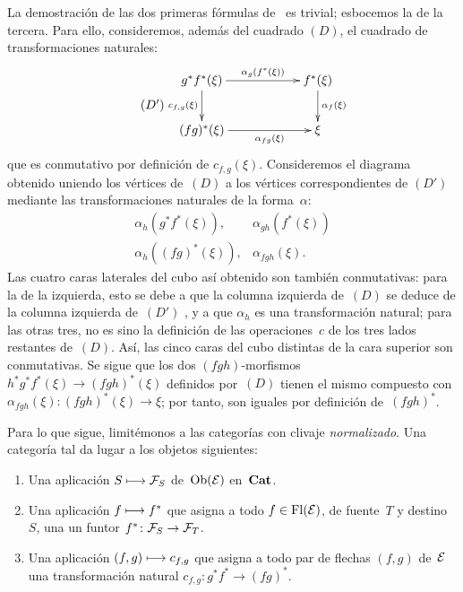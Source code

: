 {\ignorespaces}
{\enlargethispage{.5cm}}
La demostración de las dos primeras fórmulas de~ es trivial;
esbocemos la de la tercera. Para ello, consideremos, además del cuadrado
$(D)$, el cuadrado de transformaciones naturales:
\begin{equation*}
\label{eq:VI.7.D'} \tag{$D'$}
\begin{split}
\xymatrix@C=2cm{
g^*f^*(\xi) \ar[r]^-{\alpha_g(f^*(\xi))}
\ar[d]_{c_{f,g}(\xi)} & f^*(\xi) \ar[d]^{\alpha_f(\xi)} \\
(fg)^*(\xi) \ar[r]_-{\alpha_{fg}(\xi)} & \xi }
\end{split}
\end{equation*}
que
es conmutativo por definición de $c_{f,g}(\xi)$. Consideremos el diagrama
obtenido uniendo los vértices de~$(D)$ a los vértices correspondientes de
$(D')$ mediante las transformaciones naturales de la forma~$\alpha$:
$$
\begin{array}{ll}
\alpha_h(g^*f^*(\xi)),&\alpha_{gh}(f^*(\xi))\\
\alpha_h((fg)^*(\xi)),&\alpha_{fgh}(\xi).
\end{array}
$$
Las cuatro caras laterales del cubo así obtenido son también conmutativas:
para la de la izquierda, esto se debe a que la columna izquierda de~$(D)$
se deduce de la columna izquierda de~$(D')$
%
, y a que $\alpha_h$ es una transformación natural; para las otras tres,
no es sino la definición de las operaciones~$c$ de los tres lados restantes
de~$(D)$. Así, las cinco caras del cubo distintas de la cara superior son
conmutativas. Se sigue que los dos $(fgh)$-morfismos
$h^*g^*f^*(\xi)\to(fgh)^*(\xi)$ definidos por~$(D)$ tienen el mismo
compuesto con $\alpha_{fgh}(\xi)\colon(fgh)^*(\xi)\to\xi$; por tanto, son
iguales por definición de~$(fgh)^*$.

Para lo que sigue, limitémonos a las categorías con clivaje
\emph{normalizado}. Una categoría tal da lugar a los objetos siguientes:
\begin{enumerate}
\item[a)] Una aplicación $S\mto\cal{F}_S$ de~$\Ob(\cal{E})$ en~$\Cat$.
\item[b)] Una aplicación $f\mto f^*$ que asigna a todo
$f\in\Fl(\cal{E})$, de fuente~$T$ y destino~$S$,
{una}
{un}
funtor $f^*\colon\cal{F}_S\to\cal{F}_T$.
\item[c)] Una aplicación $(f,g)\mto c_{f,g}$ que asigna a todo par de
flechas $(f,g)$ de~$\cal{E}$ una transformación natural
$c_{f,g}\colon g^*f^*\to(fg)^*$.
\end{enumerate}

